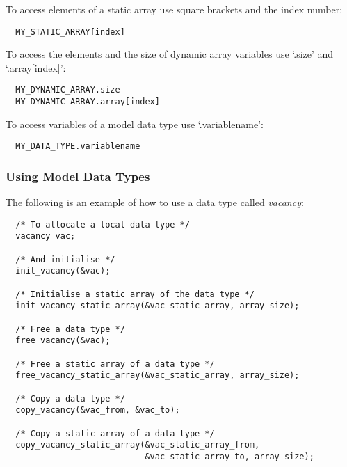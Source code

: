 To access elements of a static array use square brackets and the index number:

\begin{verbatim}
  MY_STATIC_ARRAY[index]
\end{verbatim}

To access the elements and the size of dynamic array variables use
`.size' and `.array[index]':

\begin{verbatim}
  MY_DYNAMIC_ARRAY.size
  MY_DYNAMIC_ARRAY.array[index]
\end{verbatim}

To access variables of a model data type use `.variablename':

\begin{verbatim}
  MY_DATA_TYPE.variablename
\end{verbatim}

\subsubsection{Using Model Data Types}

The following is an example of how to use a data type called
\emph{vacancy}:

\begin{verbatim}
  /* To allocate a local data type */
  vacancy vac;
  
  /* And initialise */
  init_vacancy(&vac);
  
  /* Initialise a static array of the data type */
  init_vacancy_static_array(&vac_static_array, array_size);
  
  /* Free a data type */
  free_vacancy(&vac);
  
  /* Free a static array of a data type */
  free_vacancy_static_array(&vac_static_array, array_size);
  
  /* Copy a data type */
  copy_vacancy(&vac_from, &vac_to);
  
  /* Copy a static array of a data type */
  copy_vacancy_static_array(&vac_static_array_from,
                            &vac_static_array_to, array_size);
  \end{verbatim}


